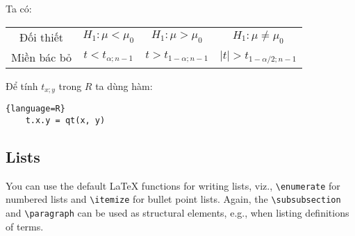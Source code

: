 Ta có:

\begin{center}
    \begin{tabular}{| c | c | c | c |}
        \hline
        Đối thiết & $H_1: \mu < \mu_0$ & $H_1: \mu > \mu_0$ & $H_1: \mu \neq \mu_0$ \\
        Miền bác bỏ & $t < t_{\alpha; n - 1}$ & $t > t_{1-\alpha; n - 1}$ & $\lvert t \rvert > t_{1 - \alpha / 2; n - 1}$ \\
        \hline
    \end{tabular}
\end{center}

Để tính $t_{x; y}$ trong $R$ ta dùng hàm:

\begin{lstlisting}{language=R}
    t.x.y = qt(x, y)
\end{lstlisting}

\subsection{Lists}
You can use the default \LaTeX \- functions for writing lists, viz., \texttt{\textbackslash enumerate} for numbered lists and \texttt{\textbackslash itemize} for bullet point lists. Again, the \texttt{\textbackslash subsubsection} and \texttt{\textbackslash paragraph} can be used as structural elements, e.g., when listing definitions of terms.


